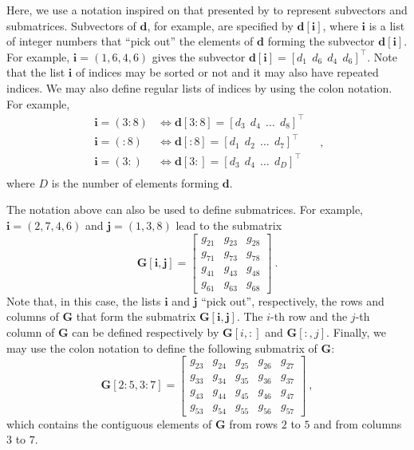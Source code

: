 Here, we use a notation inspired on that presented by \cite[][p. 4]{vanloan1992} to represent subvectors and submatrices.
Subvectors of $\mathbf{d}$, for example, are specified by $\mathbf{d}[\mathbf{i}]$, where $\mathbf{i}$ is a
list of integer numbers that ``pick out'' the elements of $\mathbf{d}$ forming the subvector $\mathbf{d}[\mathbf{i}]$.
For example, $\mathbf{i} = (1, 6, 4, 6)$ gives the subvector $\mathbf{d}[\mathbf{i}] = [ d_{1} \:\: d_{6} \:\: d_{4} \:\: d_{6} ]^{\top} $.
Note that the list $\mathbf{i}$ of indices may be sorted or not and it may also have repeated indices.
We may also define regular lists of indices by using the colon notation. For example, 
\begin{equation*}
	\begin{split}
		\mathbf{i} = (3:8) &\Leftrightarrow \mathbf{d}[3:8] = [ d_{3} \:\: d_{4} \:\: \dots \:\: d_{8} ]^{\top} \\
		\mathbf{i} = (:8) &\Leftrightarrow \mathbf{d}[:8] = [ d_{1} \:\: d_{2} \:\: \dots \:\: d_{7} ]^{\top} \\
		\mathbf{i} = (3:) &\Leftrightarrow \mathbf{d}[3:] = [ d_{3} \:\: d_{4} \:\: \dots \:\: d_{D} ]^{\top} \\
	\end{split} \quad ,
\end{equation*}
where $D$ is the number of elements forming $\mathbf{d}$.

The notation above can also be used to define submatrices. For example, $\mathbf{i} = (2, 7, 4, 6)$ and $\mathbf{j} = (1, 3, 8)$
lead to the submatrix
\begin{equation*}
	\mathbf{G}[\mathbf{i}, \mathbf{j}] = \begin{bmatrix}
		g_{21} & g_{23} & g_{28} \\
		g_{71} & g_{73} & g_{78} \\
		g_{41} & g_{43} & g_{48} \\
		g_{61} & g_{63} & g_{68} 
	\end{bmatrix} \: .
\end{equation*}
Note that, in this case, the lists $\mathbf{i}$ and $\mathbf{j}$ ``pick out'', respectively, the rows and columns
of $\mathbf{G}$ that form the submatrix $\mathbf{G}[\mathbf{i}, \mathbf{j}]$.
The $i$-th row and the $j$-th column of $\mathbf{G}$ can be defined respectively by $\mathbf{G}[i,:]$ and $\mathbf{G}[:,j]$.
Finally, we may use the colon notation to define the following submatrix of $\mathbf{G}$:
\begin{equation*}
	\mathbf{G}[2:5,3:7] = \begin{bmatrix}
		g_{23} & g_{24} & g_{25} & g_{26} & g_{27} \\
		g_{33} & g_{34} & g_{35} & g_{36} & g_{37} \\
		g_{43} & g_{44} & g_{45} & g_{46} & g_{47} \\
		g_{53} & g_{54} & g_{55} & g_{56} & g_{57}
	\end{bmatrix} \: ,
\end{equation*}
which contains the contiguous elements of $\mathbf{G}$ from rows $2$ to $5$ and from columns
$3$ to $7$.

